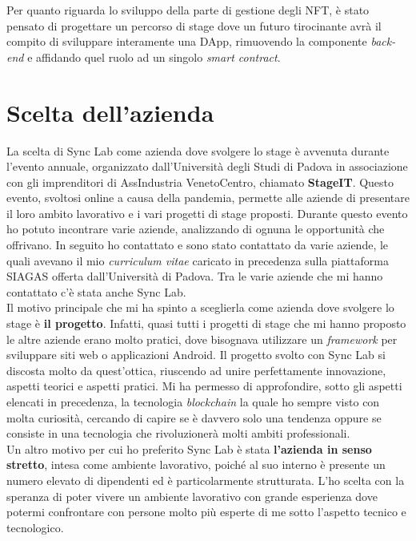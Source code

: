 Per quanto riguarda lo sviluppo della parte di gestione degli NFT, è stato pensato di progettare un percorso di stage dove un futuro tirocinante avrà il compito di sviluppare interamente una \gls{DApp}, rimuovendo la componente \textit{back-end} e affidando quel ruolo ad un singolo \textit{smart contract}.


\section{Scelta dell'azienda}
La scelta di Sync Lab come azienda dove svolgere lo stage è avvenuta durante l'evento annuale, organizzato dall'Università degli Studi di Padova in associazione con gli imprenditori di AssIndustria VenetoCentro, chiamato \textbf{StageIT}. Questo evento, svoltosi online a causa della pandemia, permette alle aziende di presentare il loro ambito lavorativo e i vari progetti di stage proposti. Durante questo evento ho potuto incontrare varie aziende, analizzando di ognuna le opportunità che offrivano. In seguito ho contattato e sono stato contattato da varie aziende, le quali avevano il mio \textit{curriculum vitae} caricato in precedenza sulla piattaforma SIAGAS offerta dall'Università di Padova. Tra le varie aziende che mi hanno contattato c'è stata anche Sync Lab. \\

Il motivo principale che mi ha spinto a sceglierla come azienda dove svolgere lo stage è \textbf{il progetto}. Infatti, quasi tutti i progetti di stage che mi hanno proposto le altre aziende erano molto pratici, dove bisognava utilizzare un \textit{framework} per sviluppare siti web o applicazioni Android. Il progetto svolto con Sync Lab si discosta molto da quest'ottica, riuscendo ad unire perfettamente innovazione, aspetti teorici e aspetti pratici. Mi ha permesso di approfondire, sotto gli aspetti elencati in precedenza, la tecnologia \textit{blockchain} la quale ho sempre visto con molta curiosità, cercando di capire se è davvero solo una tendenza oppure se consiste in una tecnologia che rivoluzionerà molti ambiti professionali. \\

Un altro motivo per cui ho preferito Sync Lab è stata \textbf{l'azienda in senso stretto}, intesa come ambiente lavorativo, poiché al suo interno è presente un numero elevato di dipendenti ed è particolarmente strutturata. L'ho scelta con la speranza di poter vivere un ambiente lavorativo con grande esperienza dove potermi confrontare con persone molto più esperte di me sotto l'aspetto tecnico e tecnologico.


